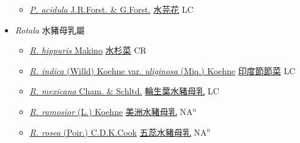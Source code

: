 \begin{itemize}
  \begin{itemize}
        \item[] \href{http://www.theplantlist.org/tpl1.1/search?q=Pemphis+acidula}{\textit{P. acidula} J.R.Forst. \& G.Forst.}   \href{\detokenize{http://taibnet.sinica.edu.tw/chi/taibnet_species_list.php?T2=水芫花&T2_new_value=true&fr=y}}{水芫花} LC
  \end{itemize}
 \item[] \textit{Rotala} 水豬母乳屬
                    
  \begin{itemize}
        \item[] \href{http://www.theplantlist.org/tpl1.1/search?q=Rotala+hippuris}{\textit{R. hippuris} Makino}   \href{\detokenize{http://taibnet.sinica.edu.tw/chi/taibnet_species_list.php?T2=水杉菜&T2_new_value=true&fr=y}}{水杉菜} CR
        \item[] \href{http://www.theplantlist.org/tpl1.1/search?q=Rotala+indica+var.+uliginosa}{\textit{R. indica} (Willd) Koehne var. \textit{uliginosa} (Miq.) Koehne}   \href{\detokenize{http://taibnet.sinica.edu.tw/chi/taibnet_species_list.php?T2=印度節節菜&T2_new_value=true&fr=y}}{印度節節菜} LC
        \item[] \href{http://www.theplantlist.org/tpl1.1/search?q=Rotala+mexicana}{\textit{R. mexicana} Cham. \& Schltd.}   \href{\detokenize{http://taibnet.sinica.edu.tw/chi/taibnet_species_list.php?T2=輪生葉水豬母乳&T2_new_value=true&fr=y}}{輪生葉水豬母乳} LC
        \item[] \href{http://www.theplantlist.org/tpl1.1/search?q=Rotala+ramosior}{\textit{R. ramosior} (L.) Koehne}   \href{\detokenize{http://taibnet.sinica.edu.tw/chi/taibnet_species_list.php?T2=美洲水豬母乳&T2_new_value=true&fr=y}}{美洲水豬母乳} NA$^n$
        \item[] \href{http://www.theplantlist.org/tpl1.1/search?q=Rotala+rosea}{\textit{R. rosea} (Poir.) C.D.K.Cook}   \href{\detokenize{http://taibnet.sinica.edu.tw/chi/taibnet_species_list.php?T2=五蕊水豬母乳&T2_new_value=true&fr=y}}{五蕊水豬母乳} NA$^n$

\end{itemize}
\end{itemize}
